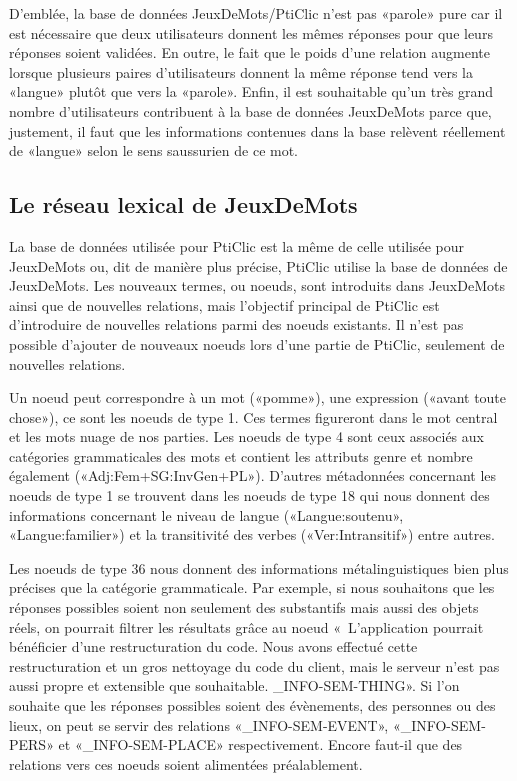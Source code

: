 \documentclass[a4paper,11pt,french]{article}
\begin{document}
D'emblée, la base de données JeuxDeMots/PtiClic n'est pas «parole» pure car il est nécessaire que deux utilisateurs donnent les mêmes réponses pour que leurs réponses soient validées. En outre, le fait que le poids d'une relation augmente lorsque plusieurs paires d'utilisateurs donnent la même réponse tend vers la «langue» plutôt que vers la «parole». Enfin, il est souhaitable qu'un très grand nombre d'utilisateurs contribuent à la base de données JeuxDeMots parce que, justement, il faut que les informations contenues dans la base relèvent réellement de «langue» selon le sens saussurien de ce mot. 


\subsection{Le réseau lexical de JeuxDeMots}

La base de données utilisée pour PtiClic est la même de celle utilisée pour JeuxDeMots ou, dit de manière plus précise, PtiClic utilise la base de données de JeuxDeMots. Les nouveaux termes, ou noeuds, sont introduits dans JeuxDeMots ainsi que de nouvelles relations, mais l'objectif principal de PtiClic est d'introduire de nouvelles relations parmi des noeuds existants. Il n'est pas possible d'ajouter de nouveaux noeuds lors d'une partie de PtiClic, seulement de nouvelles relations. 

Un noeud peut correspondre à un mot («pomme»), une expression («avant toute chose»), ce sont les noeuds de type 1. Ces termes figureront dans le mot central et les mots nuage de nos parties. Les noeuds de type 4 sont ceux associés aux catégories grammaticales des mots et contient les attributs genre et nombre également («Adj:Fem+SG:InvGen+PL»). D'autres métadonnées concernant les noeuds de type 1 se trouvent dans les noeuds de type 18 qui nous donnent des informations concernant le niveau de langue («Langue:soutenu», «Langue:familier») et la transitivité des verbes («Ver:Intransitif») entre autres.

Les noeuds de type 36 nous donnent des informations métalinguistiques bien plus précises que la catégorie grammaticale. Par exemple, si nous souhaitons que les réponses possibles soient non seulement des substantifs mais aussi des objets réels, on pourrait filtrer les résultats grâce au noeud «\
L'application pourrait bénéficier d'une restructuration du code. Nous avons effectué cette restructuration et un gros
nettoyage du code du client, mais le serveur n'est pas aussi propre et extensible que souhaitable.
\_INFO-SEM-THING». Si l'on souhaite que les réponses possibles soient des évènements, des personnes ou des lieux, on peut se servir des relations «\_INFO-SEM-EVENT», «\_INFO-SEM-PERS» et «\_INFO-SEM-PLACE» respectivement. Encore faut-il que des relations vers ces noeuds soient alimentées préalablement. 
\end{document}
